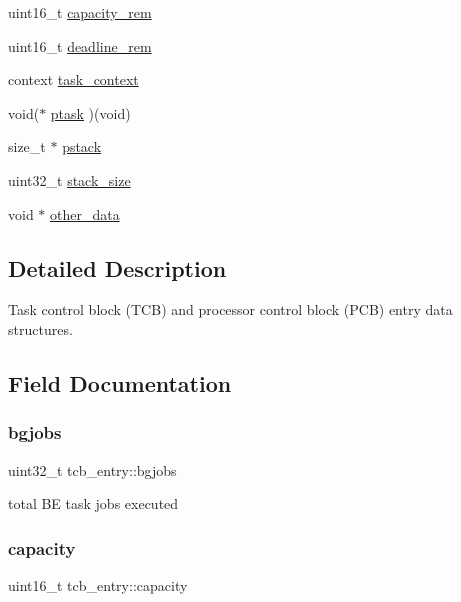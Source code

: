 \begin{DoxyCompactItemize}
uint16\+\_\+t \hyperlink{structtcb__entry_a559dce8ac2982d3c8f46808ddc52bbb9}{capacity\+\_\+rem}
\item 
uint16\+\_\+t \hyperlink{structtcb__entry_af2ba0dde6c7ae71b6341714bf096cc80}{deadline\+\_\+rem}
\item 
context \hyperlink{structtcb__entry_a589e6c94b17a97df5d22edf504acfd42}{task\+\_\+context}
\item 
void($\ast$ \hyperlink{structtcb__entry_ae22d4a7aaefabed03dbfcb18633063e2}{ptask} )(void)
\item 
size\+\_\+t $\ast$ \hyperlink{structtcb__entry_a48bcced7fc892ae8db7138786e38a898}{pstack}
\item 
uint32\+\_\+t \hyperlink{structtcb__entry_a2174ff4c5cf178e9dc3d652c472b23dd}{stack\+\_\+size}
\item 
void $\ast$ \hyperlink{structtcb__entry_accd675f017bb0ec5ae63b4d729bd73aa}{other\+\_\+data}
\end{DoxyCompactItemize}


\subsection{Detailed Description}
Task control block (T\+CB) and processor control block (P\+CB) entry data structures. 

\subsection{Field Documentation}
\mbox{\label{structtcb__entry_a27631962295edabd283477b471f2d7ae}} 
\subsubsection{\texorpdfstring{bgjobs}{bgjobs}}
{\footnotesize\ttfamily uint32\+\_\+t tcb\+\_\+entry\+::bgjobs}

total BE task jobs executed \mbox{\label{structtcb__entry_a2a3c8e5e81c910ccd845a8d1f58d550a}} 
\subsubsection{\texorpdfstring{capacity}{capacity}}
{\footnotesize\ttfamily uint16\+\_\+t tcb\+\_\+entry\+::capacity}

